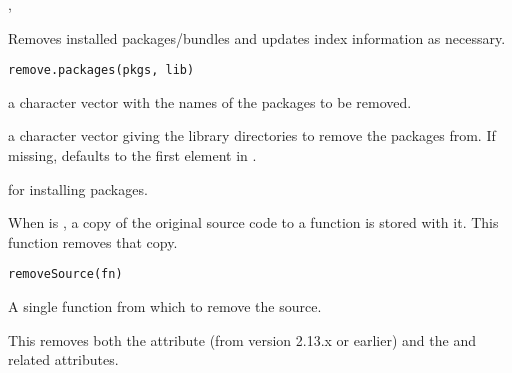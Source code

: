 %
\begin{SeeAlso}\relax
{}, 
\end{SeeAlso}
%
\begin{Description}\relax
Removes installed packages/bundles and updates index information
as necessary.
\end{Description}
%
\begin{Usage}
\begin{verbatim}
remove.packages(pkgs, lib)
\end{verbatim}
\end{Usage}
%
\begin{Arguments}
\begin{ldescription}
\item[\code{pkgs}] a character vector with the names of the packages to be removed.
\item[\code{lib}] a character vector giving the library directories to remove the
packages from.  If missing, defaults to the first element in
.
\end{ldescription}
\end{Arguments}
%
\begin{SeeAlso}\relax
{} for installing packages.
\end{SeeAlso}
%
\begin{Description}\relax
When  is , a copy of the
original source code to a function is stored with it.  This function
removes that copy.
\end{Description}
%
\begin{Usage}
\begin{verbatim}
removeSource(fn)
\end{verbatim}
\end{Usage}
%
\begin{Arguments}
\begin{ldescription}
\item[\code{fn}] 
A single function from which to remove the source.

\end{ldescription}
\end{Arguments}
%
\begin{Details}\relax
This removes both the  attribute (from \R{} version
2.13.x or earlier) and the  and related attributes.
\end{Details}
